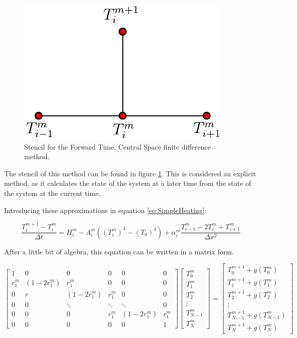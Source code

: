 \begin{figure}[h]
    \centering
    \includegraphics[width=0.35\columnwidth]{Stencils_FiniteDifferences/FTCS.pdf}
    \caption{Stencil for the Forward Time, Central Space finite difference method.}
    \label{fig:StencilFTCS}
\end{figure}

The stencil of this method can be found in figure \ref{fig:StencilFTCS}. This is considered an explicit method, as it calculates the state of the system at a later time from the state of the system at the current time. 

Introducing these approximations in equation \ref{eq:SimpleHeating}:

\begin{equation}
    \frac{T^{m+1}_i - T^m_i}{\Delta t} = H^m_i - A_i^m \left((T_i^m )^4 - (T_0)^4\right) +\alpha_i^m    \frac{T^{m}_{i-1}-2T^m_{i}+T^m_{i+1}}{\Delta x^2}
\end{equation}

After a little bit of algebra, this equation can be written in a matrix form.

$$
\begin{bmatrix}
         1 & 0 & 0 & 0 & 0 & 0 \\
         r^m_1 & \left(1-2r^m_1\right) & r^m_1 & 0 & 0 & 0 \\ 
         0 & r & \left(1-2r^m_1\right) & r^m_1 & 0 & 0 \\ 
         0 & 0 & \ddots & \ddots & \ddots & 0 \\
         0 & 0 & 0 & r^m_1 & \left(1-2r^m_1\right) & r^m_1 \\
         0 & 0 & 0 & 0 & 0 & 1 
     \end{bmatrix}
\begin{bmatrix}
         T^m_0  \\
         T^m_1 \\ 
         T^m_2  \\ 
         \vdots \\
         T^m_{N-1} \\
         T^m_N 
     \end{bmatrix}
     =
     \begin{bmatrix}
         T^{m+1}_0 + g(T^m_0) \\
         T^{m+1}_1 + g(T^m_1)\\ 
         T^{m+1}_2 + g(T^m_2)\\ 
         \vdots\\ 
         T^{m+1}_{N-1} + g(T^m_{N-1})\\
         T^{m+1}_{N} + g(T^m_{N}) 
     \end{bmatrix}
$$

